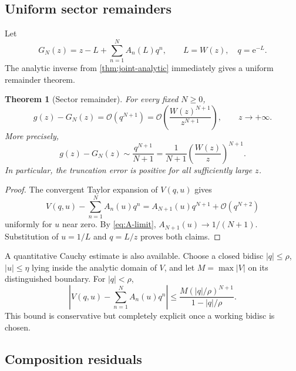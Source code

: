 \documentclass[11pt,a4paper]{article}
\numberwithin{equation}{section}
\newtheorem{theorem}{Theorem}[section]
\theoremstyle{definition}
\theoremstyle{remark}
\newcommand{\e}{\mathrm e}
\newcommand{\Ord}{\mathcal O}
\newcommand{\Acoef}{A}
\begin{document}
\subsection{Uniform sector remainders}

Let
\begin{equation}\label{eq:GN-def}
  G_N(z)=z-L+\sum_{n=1}^{N}\Acoef_n(L)q^n,
  \qquad L=W(z),\quad q=\e^{-L}.
\end{equation}
The analytic inverse from \cref{thm:joint-analytic} immediately gives a
uniform remainder theorem.

\begin{theorem}[Sector remainder]\label{thm:sector-remainder}
For every fixed \(N\ge0\),
\begin{equation}\label{eq:sector-remainder-O}
  g(z)-G_N(z)=\Ord(q^{N+1})
  =\Ord\!\left(\frac{W(z)^{N+1}}{z^{N+1}}\right),
  \qquad z\to+\infty.
\end{equation}
More precisely,
\begin{equation}\label{eq:sector-remainder-asymp}
  g(z)-G_N(z)
  \sim \frac{q^{N+1}}{N+1}
  =\frac1{N+1}\left(\frac{W(z)}{z}\right)^{N+1}.
\end{equation}
In particular, the truncation error is positive for all sufficiently large
\(z\).
\end{theorem}

\begin{proof}
The convergent Taylor expansion of \(V(q,u)\) gives
\[
 V(q,u)-\sum_{n=1}^{N}A_n(u)q^n
 =A_{N+1}(u)q^{N+1}+\Ord(q^{N+2})
\]
uniformly for \(u\) near zero.  By \eqref{eq:A-limit},
\(A_{N+1}(u)\to1/(N+1)\).  Substitution of
\(u=1/L\) and \(q=L/z\) proves both claims.
\end{proof}

A quantitative Cauchy estimate is also available.  Choose a closed bidisc
\(|q|\le\rho\), \(|u|\le\eta\) lying inside the analytic domain of
\(V\), and let \(M=\max|V|\) on its distinguished boundary.  For
\(|q|<\rho\),
\begin{equation}\label{eq:Cauchy-remainder}
 \left|V(q,u)-\sum_{n=1}^{N}A_n(u)q^n\right|
 \le \frac{M(|q|/\rho)^{N+1}}{1-|q|/\rho}.
\end{equation}
This bound is conservative but completely explicit once a working bidisc
is chosen.

\subsection{Composition residuals}
\end{document}
